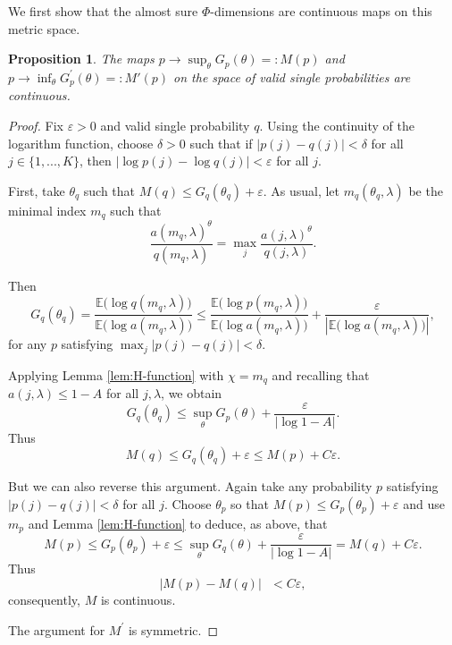 \documentclass{amsart}
\newtheorem{proposition}[theorem]{Proposition}
\theoremstyle{plain}
\numberwithin{equation}{section}
\begin{document}
We first show that the almost sure $\Phi $-dimensions are continuous maps on
this metric space.

\begin{proposition} \label{prop:single_continuous}
The maps $p\rightarrow \sup_{\theta }G_{p}(\theta )=: M(p)$ and 
$p\rightarrow \inf_{\theta }G_{p}^{\prime }(\theta )=: M'(p)$ on the space of valid
single probabilities are continuous.
\end{proposition}

\begin{proof}
Fix $\varepsilon >0$ and valid single probability $q.$ Using the continuity
of the logarithm function, choose $\delta >0$ such that if $%
|p(j)-q(j)|<\delta $ for all $j\in \{1,...,K\}$, then $|\log p(j)-\log
q(j)|<\varepsilon $ for all $j$.

First, take $\theta _{q}$ such that $M(q)\leq G_{q}(\theta _{q})+\varepsilon 
$. As usual, let $m_{q}(\theta _{q},\lambda )$ be the minimal index $m_{q}$
such that 
\begin{equation*}
\frac{a(m_{q},\lambda )^{\theta }}{q(m_{q},\lambda )}=\max_{j}\frac{a(j,\lambda )^{\theta }}{q(j,\lambda )}.
\end{equation*}

Then
\begin{equation*}
      G_{q}(\theta _{q})=
    \frac{\mathbb{E(}\log q(m_{q},\lambda ))}{\mathbb{E(}\log a(m_{q},\lambda ))}
           \leq \frac{\mathbb{E(}\log p(m_{q},\lambda ))}{\mathbb{E(}\log a(m_{q},\lambda ))}+
 \frac{\varepsilon }{\left\vert \mathbb{E(}\log a(m_{q},\lambda ))\right\vert },
\end{equation*}
for any $p$ satisfying $\max_j |p(j) - q(j)| < \delta$.

Applying Lemma \ref{lem:H-function} with $\chi =m_{q}$ and recalling that 
$a(j,\lambda )\leq 1-A$ for all $j,\lambda$, we obtain
\begin{equation*}
   G_{q}(\theta _{q})\leq \sup_{\theta }G_{p}(\theta )+\frac{\varepsilon }{|\log 1-A|}.
\end{equation*}
Thus 
\begin{equation*}
M(q)\leq G_{q}(\theta _{q})+\varepsilon \leq M(p)+C\varepsilon .
\end{equation*}

But we can also reverse this argument. Again take any probability $p$ satisfying 
 $|p(j)-q(j)|<\delta $ for all $j$. 
Choose $\theta _{p}$ so that $M(p)\leq G_{p}(\theta _{p})+\varepsilon $ and use 
$m_{p}$ and Lemma \ref{lem:H-function} to deduce, as above, that 
\begin{equation*}
    M(p)\leq G_{p}(\theta _{p})+\varepsilon \leq \sup_{\theta }G_{q}(\theta ) +
     \frac{\varepsilon }{|\log 1-A|}=M(q)+C\varepsilon .
\end{equation*}
Thus 
\begin{equation*}
            |M(p)-M(q)|\text{ }<C\varepsilon ,
\end{equation*}
consequently, $M$ is continuous.

The argument for $M^{\prime }$ is symmetric.
\end{proof}
\end{document}
